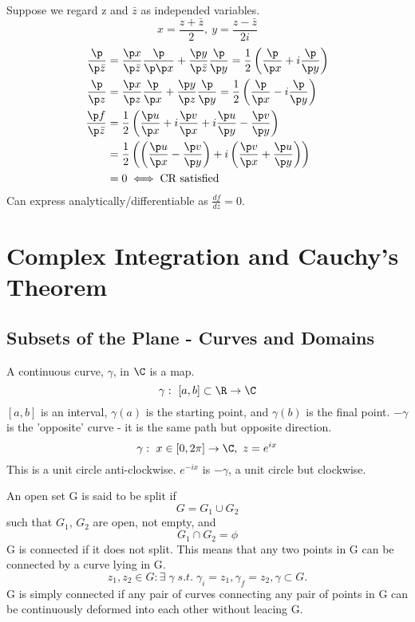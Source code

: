 \documentclass[a4paper, 11pt, normalem]{report}
\begin{document}
Suppose we regard z and $\bar{z}$ as independed variables.
\begin{equation}
    x = \frac{z + \bar{z}}{2},~ y = \frac{z - \bar{z}}{2i}
\end{equation}
\begin{align}
    \frac{\p}{\p \bar{z}} &= \frac{\p x}{\p \bar{z}}\frac{\p}{\p \p x} + \frac{\p y}{\p \bar{z}}\frac{\p}{\p y} = \frac{1}{2}\left(\frac{\p}{\p x} + i\frac{\p}{\p y}\right) \\
    \frac{\p}{\p z} &= \frac{\p x}{\p z}\frac{\p}{\p x} + \frac{\p y}{\p z}\frac{\p}{\p y} = \frac{1}{2}\left(\frac{\p}{\p x} - i\frac{\p}{\p y}\right) \\
    \frac{\p f}{\p \bar{z}} &= \frac{1}{2}\left(\frac{\p u}{\p x} + i\frac{\p v}{\p x} + i\frac{\p u}{\p y} - \frac{\p v}{\p y}\right) \\
                    &= \frac{1}{2}\left(\left(\frac{\p u}{\p x} - \frac{\p v}{\p y}\right) + i\left(\frac{\p v}{\p x} + \frac{\p u}{\p y}\right) \right) \\
                    &= 0 \iff \text{CR satisfied}
\end{align}
Can express analytically/differentiable as $\frac{df}{d\bar{z}} = 0$.

\chapter{Complex Integration and Cauchy's Theorem}
\section{Subsets of the Plane - Curves and Domains}
A continuous curve, $\gamma$, in $\C$ is a map.
\begin{equation}
    \gamma:~ [a,b] \subset \R \to \C
\end{equation}
$[a,b]$ is an interval, $\gamma(a)$ is the starting point, and $\gamma(b)$ is the final point.
$-\gamma$ is the 'opposite' curve - it is the same path but opposite direction.
\begin{equation}
    \gamma:~ x \in [0,2\pi] \to \C,~ z = e^{ix}
\end{equation}
This is a unit circle anti-clockwise.
$e^{-ix}$ is $-\gamma$, a unit circle but clockwise.

An open set G is said to be split if
\begin{equation}
    G = G_1 \cup G_2
\end{equation}
such that $G_1$, $G_2$ are open, not empty, and
\begin{equation}
    G_1 \cap G_2 = \phi
\end{equation}
G is connected if it does not split.
This means that any two points in G can be connected by a curve lying in G.
\begin{equation}
    z_1,z_2 \in G: \exists\; \gamma \; s.t. \; \gamma_i = z_1, \gamma_f = z_2, \gamma \subset G.
\end{equation}
G is simply connected if any pair of curves connecting any pair of points in G can be continuously deformed into each other without leacing G.
\end{document}
